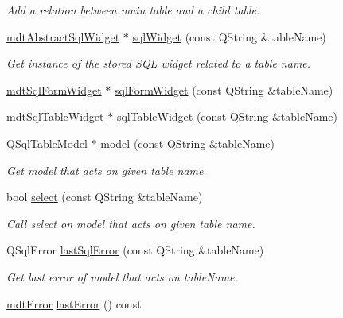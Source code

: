\begin{DoxyCompactItemize}
\begin{DoxyCompactList}\small\item\em Add a relation between main table and a child table. \end{DoxyCompactList}\item 
\hyperlink{classmdt_abstract_sql_widget}{mdt\-Abstract\-Sql\-Widget} $\ast$ \hyperlink{classmdt_sql_form_old_aebb0245ac8f4fee2586cbac61c60db3f}{sql\-Widget} (const Q\-String \&table\-Name)
\begin{DoxyCompactList}\small\item\em Get instance of the stored S\-Q\-L widget related to a table name. \end{DoxyCompactList}\item 
\hyperlink{classmdt_sql_form_widget}{mdt\-Sql\-Form\-Widget} $\ast$ \hyperlink{classmdt_sql_form_old_ae0e5815ceaced65e8465adc2fe887c51}{sql\-Form\-Widget} (const Q\-String \&table\-Name)
\item 
\hyperlink{classmdt_sql_table_widget}{mdt\-Sql\-Table\-Widget} $\ast$ \hyperlink{classmdt_sql_form_old_adc4eb9721bf1334f493d3423c89bb409}{sql\-Table\-Widget} (const Q\-String \&table\-Name)
\item 
\hyperlink{class_q_sql_table_model}{Q\-Sql\-Table\-Model} $\ast$ \hyperlink{classmdt_sql_form_old_a06590b7a39b01a781a1d60b038167955}{model} (const Q\-String \&table\-Name)
\begin{DoxyCompactList}\small\item\em Get model that acts on given table name. \end{DoxyCompactList}\item 
bool \hyperlink{classmdt_sql_form_old_a9bf735ac7d14010815ce900cbb6d765e}{select} (const Q\-String \&table\-Name)
\begin{DoxyCompactList}\small\item\em Call select on model that acts on given table name. \end{DoxyCompactList}\item 
Q\-Sql\-Error \hyperlink{classmdt_sql_form_old_aac606047522c36ed2b97b60a26032e0f}{last\-Sql\-Error} (const Q\-String \&table\-Name)
\begin{DoxyCompactList}\small\item\em Get last error of model that acts on table\-Name. \end{DoxyCompactList}\item 
\hyperlink{classmdt_error}{mdt\-Error} \hyperlink{classmdt_sql_form_old_a713fc54b324ff7a499489cbcb5289826}{last\-Error} () const 

\end{DoxyCompactItemize}
